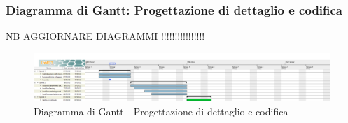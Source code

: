 \subsubsection{Diagramma di Gantt: Progettazione di dettaglio e codifica}
NB AGGIORNARE DIAGRAMMI !!!!!!!!!!!!!!!!
\begin{figure}[h!]
    \centering
    \includegraphics[scale=0.22]{../../assets/Diagrammi_Gantt/TB.png}
    \caption{Diagramma di Gantt - Progettazione di dettaglio e codifica}
\end{figure}